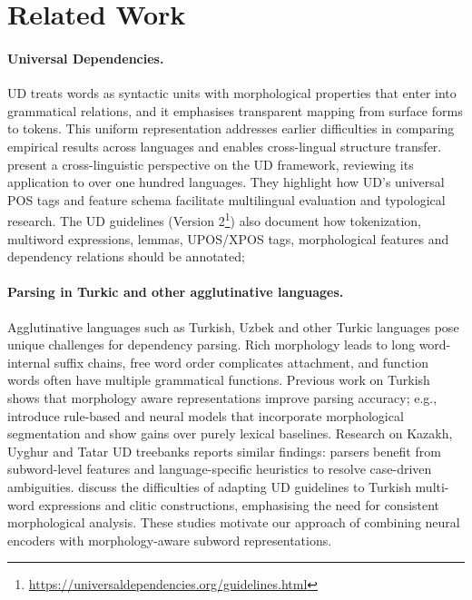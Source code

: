 \documentclass[runningheads]{llncs}
\begin{document}
\section{Related Work}
\paragraph{Universal Dependencies.}
 UD treats words as syntactic units with morphological properties that enter into grammatical relations, and it emphasises transparent mapping from surface forms to tokens.  This uniform representation addresses earlier difficulties in comparing empirical results across languages and enables cross-lingual structure transfer. \cite{de-marneffe-etal-2021-universal} present a cross-linguistic perspective on the UD framework, reviewing its application to over one hundred languages.  They highlight how UD's universal POS tags and feature schema facilitate multilingual evaluation and typological research.  The UD guidelines (Version 2\footnote{\url{https://universaldependencies.org/guidelines.html}}) also document how tokenization, multiword expressions, lemmas, UPOS/XPOS tags, morphological features and dependency relations should be annotated;

\paragraph{Parsing in Turkic and other agglutinative languages.}
Agglutinative languages such as Turkish, Uzbek and other Turkic languages pose unique challenges for dependency parsing.  Rich morphology leads to long word-internal suffix chains, free word order complicates attachment, and function words often have multiple grammatical functions\cite{MURZINTCEV2026100195}.  Previous work on Turkish shows that morphology aware representations improve parsing accuracy; e.g., \cite{eryigit-etal-2008-dependency} introduce rule-based and neural models that incorporate morphological segmentation and show gains over purely lexical baselines.  Research on Kazakh, Uyghur and Tatar UD treebanks reports similar findings: parsers benefit from subword-level features and language-specific heuristics to resolve case-driven ambiguities\cite{Marsan_undated-hp}.  \cite{noauthor_2018-qq} discuss the difficulties of adapting UD guidelines to Turkish multi-word expressions and clitic constructions, emphasising the need for consistent morphological analysis.  These studies motivate our approach of combining neural encoders with morphology-aware subword representations.
\end{document}
